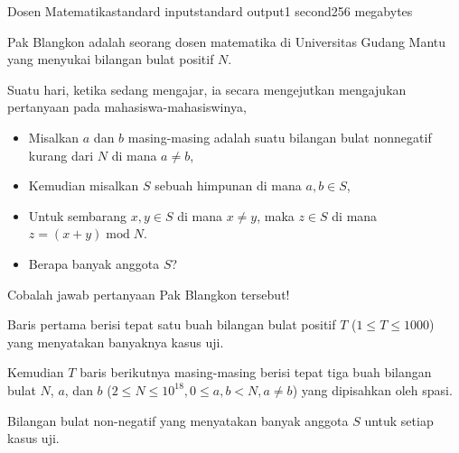 \begin{problem}{Dosen Matematika}{standard input}{standard output}{1 second}{256 megabytes}

Pak Blangkon adalah seorang dosen matematika di Universitas Gudang Mantu yang menyukai bilangan bulat positif $N$.

Suatu hari, ketika sedang mengajar, ia secara mengejutkan mengajukan pertanyaan pada mahasiswa-mahasiswinya, 
\begin{itemize}
\item Misalkan $a$ dan $b$ masing-masing adalah suatu bilangan bulat nonnegatif kurang dari $N$ di mana $a \neq b$,
\item Kemudian misalkan $S$ sebuah himpunan di mana $a,b\in{S}$,
\item Untuk sembarang $x,y \in S$ di mana $x \neq y$, maka $z\in S$ di mana $z=(x+y)\operatorname{mod}N$.
\item Berapa banyak anggota $S$?
\end{itemize}

Cobalah jawab pertanyaan Pak Blangkon tersebut!

\InputFile
Baris pertama berisi tepat satu buah bilangan bulat positif $T$ ($1 \le T \le 1000$) yang menyatakan banyaknya kasus uji.

Kemudian $T$ baris berikutnya masing-masing berisi tepat tiga buah bilangan bulat $N$, $a$, dan $b$ ($2\leq{N}\leq{10^{18}}, 0 \le a,b<{N},a\neq{b}$) yang dipisahkan oleh spasi.

\OutputFile
Bilangan bulat non-negatif yang menyatakan banyak anggota $S$ untuk setiap kasus uji.

\Example

\begin{example}
%
\end{example}

\end{problem}


